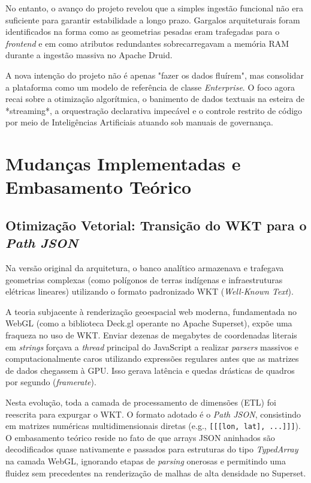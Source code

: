 \documentclass[12pt]{article}
\begin{document}
No entanto, o avanço do projeto revelou que a simples ingestão funcional não era suficiente para garantir estabilidade a longo prazo. Gargalos arquiteturais foram identificados na forma como as geometrias pesadas eram trafegadas para o \textit{frontend} e em como atributos redundantes sobrecarregavam a memória RAM durante a ingestão massiva no Apache Druid.

A nova intenção do projeto não é apenas "fazer os dados fluírem", mas consolidar a plataforma como um modelo de referência de classe \textit{Enterprise}. O foco agora recai sobre a otimização algorítmica, o banimento de dados textuais na esteira de *streaming*, a orquestração declarativa impecável e o controle restrito de código por meio de Inteligências Artificiais atuando sob manuais de governança.

\section{Mudanças Implementadas e Embasamento Teórico}

\subsection{Otimização Vetorial: Transição do WKT para o \textit{Path JSON}}
Na versão original da arquitetura, o banco analítico armazenava e trafegava geometrias complexas (como polígonos de terras indígenas e infraestruturas elétricas lineares) utilizando o formato padronizado WKT (\textit{Well-Known Text}). 

A teoria subjacente à renderização geoespacial web moderna, fundamentada no WebGL (como a biblioteca Deck.gl operante no Apache Superset), expõe uma fraqueza no uso de WKT. Enviar dezenas de megabytes de coordenadas literais em \textit{strings} forçava a \textit{thread} principal do JavaScript a realizar \textit{parsers} massivos e computacionalmente caros utilizando expressões regulares antes que as matrizes de dados chegassem à GPU. Isso gerava latência e quedas drásticas de quadros por segundo (\textit{framerate}).

Nesta evolução, toda a camada de processamento de dimensões (ETL) foi reescrita para expurgar o WKT. O formato adotado é o \textit{Path JSON}, consistindo em matrizes numéricas multidimensionais diretas (e.g., \texttt{[[[lon, lat], ...]]]}). O embasamento teórico reside no fato de que arrays JSON aninhados são decodificados quase nativamente e passados para estruturas do tipo \textit{TypedArray} na camada WebGL, ignorando etapas de \textit{parsing} onerosas e permitindo uma fluidez sem precedentes na renderização de malhas de alta densidade no Superset.
\end{document}
